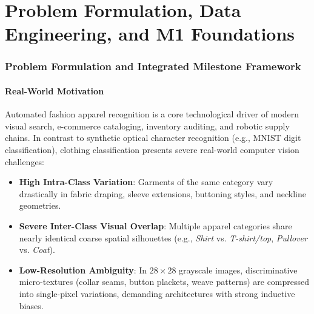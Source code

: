 \documentclass[11pt, a4paper]{article}
\begin{document}
\tableofcontents
\newpage

\part{Problem Formulation, Data Engineering, and M1 Foundations}
\label{part:data_m1}

\section{Problem Formulation and Integrated Milestone Framework}
\label{sec:problem_formulation}

\subsection{Real-World Motivation}
Automated fashion apparel recognition is a core technological driver of modern visual search, e-commerce cataloging, inventory auditing, and robotic supply chains. In contrast to synthetic optical character recognition (e.g., MNIST digit classification), clothing classification presents severe real-world computer vision challenges:
\begin{itemize}[noitemsep]
  \item \textbf{High Intra-Class Variation}: Garments of the same category vary drastically in fabric draping, sleeve extensions, buttoning styles, and neckline geometries.
  \item \textbf{Severe Inter-Class Visual Overlap}: Multiple apparel categories share nearly identical coarse spatial silhouettes (e.g., \textit{Shirt} vs. \textit{T-shirt/top}, \textit{Pullover} vs. \textit{Coat}).
  \item \textbf{Low-Resolution Ambiguity}: In $28 \times 28$ grayscale images, discriminative micro-textures (collar seams, button plackets, weave patterns) are compressed into single-pixel variations, demanding architectures with strong inductive biases.
\end{itemize}
\end{document}
